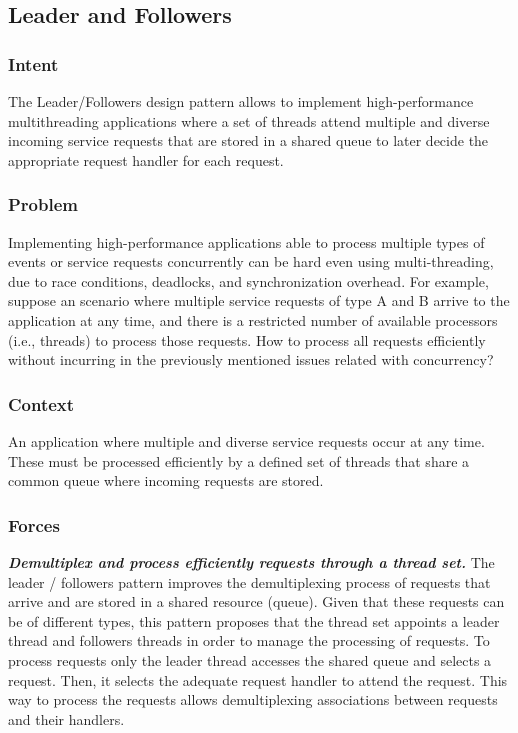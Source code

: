 \subsection{Leader and Followers}

\subsubsection{Intent}

The Leader/Followers design pattern allows to implement high-performance multithreading applications where a set of threads attend multiple and diverse incoming service requests that are stored in a shared queue to later decide the appropriate request handler for each request. 

\subsubsection{Problem}

Implementing high-performance applications able to process multiple types of events or service requests concurrently can be hard even using multi-threading, due to race conditions, deadlocks, and synchronization overhead. For example, suppose an scenario where multiple service requests of type A and B arrive to the application at any time, and there is a restricted number of available processors (i.e., threads) to process those requests. How to process all requests efficiently without incurring in the previously mentioned issues related with concurrency?  

\subsubsection{Context}

An application where multiple and diverse service requests occur at any time. These must be processed efficiently by a defined set of threads that share a common queue where incoming requests are stored.

\subsubsection{Forces}

\noindent \textbf{\textit{Demultiplex and process efficiently requests through a thread set.}}\textit{ }The leader / followers pattern improves the demultiplexing process of requests that arrive and are stored in a shared resource (queue). Given that these requests can be of different types, this pattern proposes that the thread set appoints a leader thread and followers threads in order to manage the processing of requests. To process requests only the leader thread accesses the shared queue and selects a request. Then, it selects the adequate request handler to attend the request. This way to process the requests allows demultiplexing associations between requests and their handlers.\\

